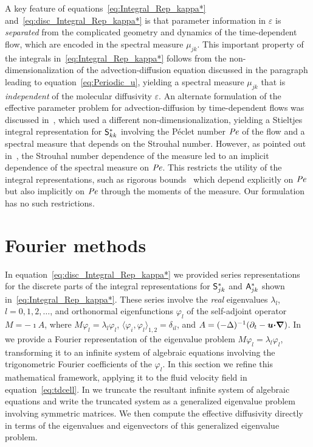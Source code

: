 \documentclass[amsa]{ipart}
\begin{document}
A key feature of equations~\eqref{eq:Integral_Rep_kappa*}
and~\eqref{eq:disc_Integral_Rep_kappa*} is that 
parameter information in $\varepsilon$ is \emph{separated} from the complicated
geometry and dynamics of the time-dependent flow, which are encoded
in the spectral measure $\mu_{jk}$. This important property of the integrals
in~\eqref{eq:Integral_Rep_kappa*} follows from the
non-dimensionalization of the advection-diffusion equation discussed
in the paragraph leading 
to equation~\eqref{eq:Periodic_u}, yielding a spectral measure $\mu_{jk}$ that
is \emph{independent} of the molecular diffusivity $\varepsilon$. An alternate
formulation of the effective parameter problem for advection-diffusion
by time-dependent flows was discussed in~\cite{Avellaneda:PRE:3249},
which used a different 
non-dimensionalization, yielding a Stieltjes integral representation
for $\mathsf{S}^*_{kk}$ involving the P{\'e}clet number $\mbox{\textit{Pe}}$ of the flow and a
spectral measure that depends on the Strouhal number. However, as pointed
out in~\cite{Bonn:McLaughlin:JFM:2001:345}, the Strouhal number
dependence of the measure led to an implicit
dependence of the spectral measure on $\mbox{\textit{Pe}}$. This restricts the
utility of the integral representations, such as rigorous
bounds~\cite{Baker:1996:Book:Pade,Golden:CMP-473} which depend
explicitly on $\mbox{\textit{Pe}}$ but also implicitly on $\mbox{\textit{Pe}}$ through the
moments of the measure. Our formulation has no such restrictions. 




  
\section{Fourier methods}
\label{sec:Fourier_Methods} 
%
In equation~\eqref{eq:disc_Integral_Rep_kappa*} we provided series
representations for the discrete parts of the integral representations
for $\mathsf{S}^*_{jk}$ and $\mathsf{A}^*_{jk}$ shown
in~\eqref{eq:Integral_Rep_kappa*}. These series involve the  
\emph{real} 
eigenvalues $\lambda_l$, $l=0,1,2,\ldots$, and orthonormal eigenfunctions $\varphi_l$ 
of the self-adjoint operator $M=-\imath A$, where $M\varphi_l=\lambda_l\varphi_l$,
$\langle\varphi_i,\varphi_l\rangle_{1,2}=\delta_{il}$, and $A=(-\Delta)^{-1}(\partial_t-\boldsymbol{u} \mbox{\boldmath${\cdot}$}\mbox{\boldmath${\nabla}$})$. In
 we provide a Fourier representation
of the eigenvalue problem $M\varphi_l=\lambda_l\varphi_l$, transforming it to an
infinite system of algebraic equations involving the trigonometric
Fourier coefficients of the $\varphi_l$. In this section we
refine this mathematical framework, applying it to the fluid velocity
field in equation~\eqref{eq:tdcell}. In  we
truncate the resultant infinite system of algebraic equations and write
the truncated system as a generalized eigenvalue problem involving
symmetric matrices. We then compute the effective diffusivity directly
in terms of the eigenvalues and eigenvectors of this generalized
eigenvalue problem. 
\end{document}
